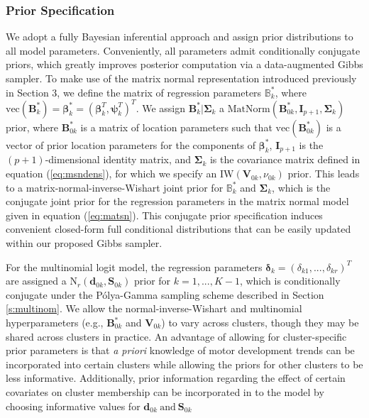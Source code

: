 \documentclass[useAMS,referee]{biom}
\begin{document}
\subsubsection{Prior Specification}
We adopt a fully Bayesian inferential approach and assign prior distributions to all model parameters. Conveniently, all parameters admit conditionally conjugate priors, which greatly improves posterior computation via a data-augmented Gibbs sampler. To make use of the matrix normal representation introduced previously in Section 3, we define the matrix of regression parameters $\mathbb{B}^*_k$, where $\text{vec}(\mathbf{B}^*_k) = \boldsymbol\beta^*_k = (\boldsymbol\beta_k^T,\boldsymbol\psi_k^T)^T$. We assign $\mathbf{B}^*_k|\boldsymbol\Sigma_k$ a $\text{MatNorm}(\mathbf{B}^*_{0k},\mathbf{I}_{p+1},\boldsymbol\Sigma_k)$ prior, where $\mathbf{B}^*_{0k}$ is a matrix of location parameters such that $\text{vec}(\mathbf{B}^*_{0k})$ is a vector of prior location parameters for the components of $\boldsymbol\beta^*_k$, $\mathbf{I}_{p+1}$ is the $(p+1)$-dimensional identity matrix, and $\boldsymbol\Sigma_k$ is the covariance matrix defined in equation (\ref{eq:msndens}), for which we specify an $\text{IW}(\mathbf{V}_{0k},\nu_{0k})$ prior. This leads to a matrix-normal-inverse-Wishart joint prior for $\mathbb{B}^*_k$ and $\boldsymbol\Sigma_k$, which is the conjugate joint prior for the regression parameters in the matrix normal model given in equation (\ref{eq:matsn}). This conjugate prior specification induces convenient closed-form full conditional distributions that can be easily updated within our proposed Gibbs sampler. 

For the multinomial logit model, the regression parameters $\boldsymbol\delta_k = (\delta_{k1},...,\delta_{kr})^T$ are assigned a $\text{N}_r(\mathbf{d}_{0k}, \mathbf{S}_{0k})$ prior for $k = 1,...,K-1$, which is conditionally conjugate under the P\'olya-Gamma sampling scheme described in Section \ref{s:multinom}. We allow the normal-inverse-Wishart and multinomial hyperparameters (e.g., $\mathbf{B}^*_{0k}$ and $\mathbf{V}_{0k}$) to vary across clusters, though they may be shared across clusters in practice. An advantage of allowing for cluster-specific prior parameters is that \textit{a priori} knowledge of motor development trends can be incorporated into certain clusters while allowing the priors for other clusters to be less informative. Additionally, prior information regarding the effect of certain covariates on cluster membership can be incorporated in to the model by choosing informative values for $\mathbf{d}_{0k} \ \text{and} \ \mathbf{S}_{0k}$
\end{document}
